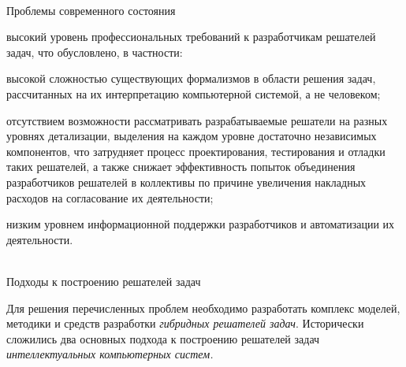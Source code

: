 \begin{frame}{\\Проблемы современного состояния}
	\topline
	\justifying
	\vspace*{\fill}\\
	\begin{textitemize}
		\item высокий уровень профессиональных требований к разработчикам решателей задач, что обусловлено, в частности:
		\begin{textitemize}
			\item высокой сложностью существующих формализмов в области решения задач, рассчитанных на их интерпретацию компьютерной системой, а не человеком;
			\item отсутствием возможности рассматривать разрабатываемые решатели на разных уровнях детализации, выделения на каждом уровне достаточно независимых компонентов, что затрудняет процесс проектирования, тестирования и отладки таких решателей, а также снижает эффективность попыток объединения разработчиков решателей в коллективы по причине увеличения накладных расходов на согласование их деятельности;
			\item низким уровнем информационной поддержки разработчиков и автоматизации их деятельности.
		\end{textitemize}
	\end{textitemize}
\end{frame}

\begin{frame}{\\Подходы к построению решателей задач}
	\topline
	\justifying
	\vspace*{\fill}\\
	\footnotesize{
		Для решения перечисленных проблем необходимо разработать комплекс моделей, методики и средств разработки \textit{гибридных решателей задач}. Исторически сложились два основных подхода к построению решателей задач \textit{интеллектуальных компьютерных систем.}\\
		\begin{SCn}
			\begin{scnindent}
			\end{scnindent}
		\end{SCn}
	}
\end{frame}

